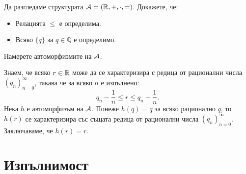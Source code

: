 \begin{problem}
  Да разгледаме структурата $\mathcal{A} = (\mathbb{R}, +, \cdot, =)$.
  Докажете, че:
  \begin{itemize}
  \item
    Релацията $\leq$ е определима.
  \item
    Всяко $\{q\}$ за $q \in \mathbb{Q}$ е определимо.
  \end{itemize}
  Намерете автоморфизмите на $\mathcal{A}$.
\end{problem}
\begin{hint}
  Знаем, че всяко $r \in \mathbb{R}$ може да се характеризира с редица от рационални числа $(q_n)^\infty_{n=0}$, такава че
  за всяко $n$ е изпълнено:
  \[ q_n - \frac{1}{n} \leq r \leq q_n + \frac{1}{n}.\]
  Нека $h$ е автоморфизъм на $\mathcal{A}$. Понеже $h(q) = q$ за всяко рационално $q$, то
  $h(r)$ се характеризира със същата редица от рационални числа $(q_n)^{\infty}_{n=0}$.
  Заключаваме, че $h(r) = r$.
\end{hint}



\section{Изпълнимост}


